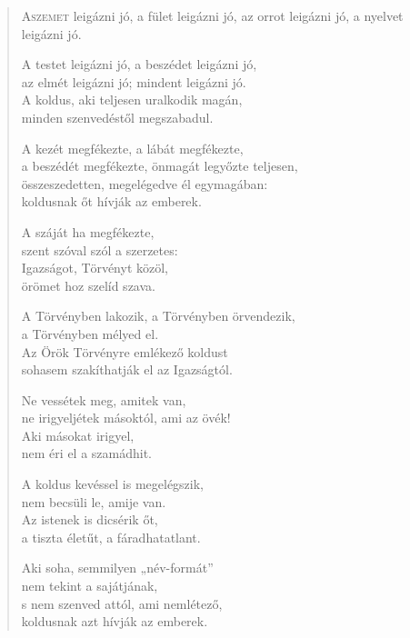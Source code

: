 
\begin{verse}

{\par%
\lettrine{A}{szemet} {\LettrineTextFont leigázni jó,}\newline
a fület leigázni jó,\newline
az orrot leigázni jó,\verselinebreak
a nyelvet leigázni jó.
\par}

 A testet leigázni jó, a beszédet leigázni jó,\\
az elmét leigázni jó; mindent leigázni jó.\\
A koldus, aki teljesen uralkodik magán,\\
minden szenvedéstől megszabadul.

 A kezét megfékezte, a lábát megfékezte,\\
a beszédét megfékezte, önmagát legyőzte teljesen,\\
összeszedetten, megelégedve él egymagában:\\
koldusnak őt hívják az emberek.

 A száját ha megfékezte,\\
szent szóval szól a szerzetes:\\
Igazságot, Törvényt közöl,\\
örömet hoz szelíd szava.

 A Törvényben lakozik, a Törvényben örvendezik,\\
a Törvényben mélyed el.\\
Az Örök Törvényre emlékező koldust\\
sohasem szakíthatják el az Igazságtól.

 Ne vessétek meg, amitek van,\\
ne irigyeljétek másoktól, ami az övék!\\
Aki másokat irigyel,\\
nem éri el a szamádhit.

 A koldus kevéssel is megelégszik,\\
nem becsüli le, amije van.\\
Az istenek is dicsérik őt,\\
a tiszta életűt, a fáradhatatlant.

 Aki soha, semmilyen „név-formát”\\
nem tekint a sajátjának,\\
s nem szenved attól, ami nemlétező,\\
koldusnak azt hívják az emberek.


\end{verse}
